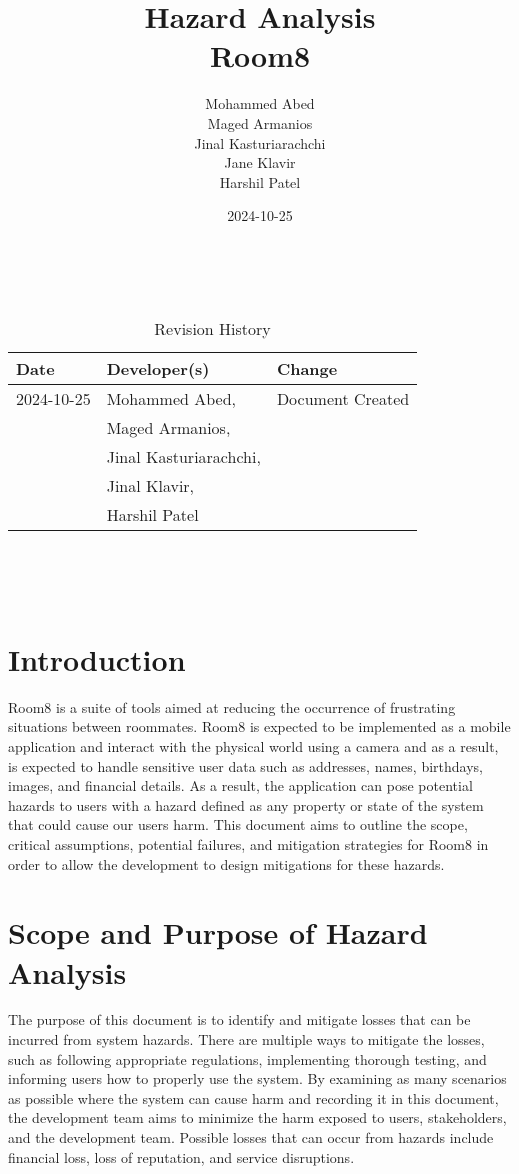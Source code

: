 \documentclass{article}
\title{Hazard Analysis\\Room8}
\author{Mohammed Abed \\ 
        Maged Armanios\\
        Jinal Kasturiarachchi\\
        Jane Klavir\\
        Harshil Patel\\}
\date{2024-10-25}
\begin{document}
\maketitle
\thispagestyle{empty}

~\newpage


\begin{table}[hp]
\caption{Revision History} \label{TblRevisionHistory}
\begin{tabularx}{\textwidth}{llX}
\toprule
\textbf{Date} & \textbf{Developer(s)} & \textbf{Change}\\
\midrule
2024-10-25 & Mohammed Abed, & Document Created\\
 & Maged Armanios, & \\
 & Jinal Kasturiarachchi, & \\
 & Jinal Klavir, & \\
 & Harshil Patel & \\
\bottomrule
\end{tabularx}
\end{table}

~\newpage

\tableofcontents

~\newpage


\section{Introduction}

Room8 is a suite of tools aimed at reducing the occurrence of frustrating situations between roommates. Room8 is expected to be implemented as a mobile application and interact with the physical world using a camera and as a result, is expected to handle sensitive user data such as addresses, names, birthdays, images, and financial details. As a result, the application can pose potential hazards to users with a hazard defined as any property or state of the system that could cause our users harm. This document aims to outline the scope, critical assumptions, potential failures, and mitigation strategies for Room8 in order to allow the development to design mitigations for these hazards.


\section{Scope and Purpose of Hazard Analysis}

The purpose of this document is to identify and mitigate losses that can be incurred from system hazards. There are multiple ways to mitigate the losses, such as following appropriate regulations, implementing thorough testing, and informing users how to properly use the system. By examining as many scenarios as possible where the system can cause harm and recording it in this document, the development team aims to minimize the harm exposed to users, stakeholders, and the development team. Possible losses that can occur from hazards include financial loss, loss of reputation, and service disruptions.      
\end{document}
